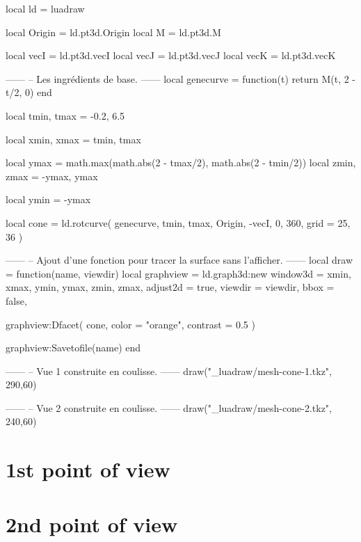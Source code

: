 \documentclass[varwidth, border = 3pt]{standalone}
\begin{document}
\begin{luadraw*}{}
local ld = luadraw

local Origin = ld.pt3d.Origin
local M      = ld.pt3d.M

local vecI = ld.pt3d.vecI
local vecJ = ld.pt3d.vecJ
local vecK = ld.pt3d.vecK

------
-- Les ingrédients de base.
------
local genecurve = function(t)
  return M(t, 2 - t/2, 0)
end

local tmin, tmax = -0.2, 6.5

local xmin, xmax = tmin, tmax

local ymax = math.max(math.abs(2 - tmax/2), math.abs(2 - tmin/2))
local zmin, zmax = -ymax, ymax

local ymin = -ymax

local cone = ld.rotcurve(
  genecurve, tmin, tmax,
  {Origin, -vecI},
  0, 360,
  {
    grid = {25, 36}
  }
)

------
-- Ajout d'une fonction pour tracer la surface sans l'afficher.
------
local draw = function(name, viewdir)
    local graphview = ld.graph3d:new{
      window3d = {xmin, xmax, ymin, ymax, zmin, zmax},
      adjust2d = true,
      viewdir  = viewdir,
      bbox     = false,
    }
    
    graphview:Dfacet(
        cone,
        {
          color  = "orange",
          contrast = 0.5
        }
    )
    
    graphview:Savetofile(name)
end

------
-- Vue 1 construite en coulisse.
------
draw("_luadraw/mesh-cone-1.tkz", {290,60})

------
-- Vue 2 construite en coulisse.
------
draw("_luadraw/mesh-cone-2.tkz", {240,60})
\end{luadraw*}


\section*{1st point of view}




\section*{2nd point of view}


\end{document}
